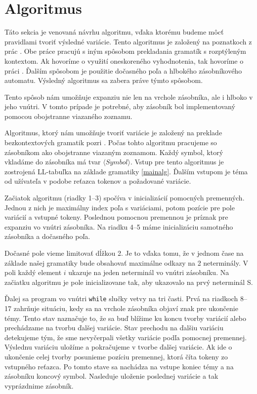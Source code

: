 \section{Algoritmus}
\label{sec:alg}
Táto sekcia je venovaná návrhu algoritmu, vďaka ktorému budeme môcť pravidlami tvoriť výsledné variácie. Tento algoritmus je založený na poznatkoch z prác \cite{tablemusic, FITPUB10498}. Obe práce pracujú s iným spôsobom prekladania gramatík s rozptýleným kontextom. Ak hovoríme o využití oneskoreného vyhodnotenia, tak hovoríme o práci \cite{tablemusic}. Ďalším spôsobom je použitie dočasného poľa a hlbokého zásobníkového automatu. Výsledný algoritmus sa zabera práve týmto spôsobom.

Tento spôsob nám umožňuje expanziu nie len na vrchole zásobníka, ale i hlboko v jeho vnútri. V tomto prípade je potrebné, aby zásobník bol implementovaný pomocou obojstranne viazaného zoznamu.

Algoritmus, ktorý nám umožňuje tvoriť variácie je založený na preklade bezkontextových gramatik pozri \cite{FITPUB10524}. Počas tohto algoritmu pracujeme so zásobníkom ako obojstranne viazaným zoznamom. Každý symbol, ktorý vkladáme do zásobníka má tvar $ \langle Symbol \rangle $. Vstup pre tento algoritmus je zostrojená LL-tabuľka na základe gramatiky \ref{mainalg}. Ďalším vstupom je téma od užívateľa v podobe reťazca tokenov a požadované variácie.

Začiatok algoritmu (riadky 1--3) spočíva v inicializácií pomocných premenných. Jednou z nich je maximálny index poľa s variáciami, potom pozície pre pole variácií a vstupné tokeny. Poslednou pomocnou premennou je príznak pre expanziu vo vnútri zásobníka. Na riadku 4--5 máme inicializáciu samotného zásobníka a dočasného poľa.

Dočasné pole vieme limitovať dĺžkou 2. Je to vďaka tomu, že v jednom čase na základe našej gramatiky bude obsahovať maximálne odkazy na 2 neterminály. V poli každý element $i$ ukazuje na jeden neterminál vo vnútri zásobníku. Na začiatku algoritmu je pole inicializovane tak, aby ukazovalo na prvý neterminál S.

Ďalej sa program vo vnútri \texttt{while} slučky vetvy na tri časti. Prvá na riadkoch 8--17 zahrňuje situáciu, kedy sa na vrchole zásobníka objaví znak pre ukončenie témy. Tento stav naznačuje to, že sa buď blížime ku koncu tvorby variácií alebo prechádzame na tvorbu ďalšej variácie. Stav prechodu na ďalšiu variáciu detekujeme tým, že sme nevyčerpali všetky variácie podľa pomocnej premennej. Výslednu variáciu uložíme a pokračujeme v tvorbe ďalšej variácie. Ak ide o ukončenie celej tvorby posunieme pozíciu premennej, ktorá číta tokeny zo vstupného reťazca. Po tomto stave sa nachádza na vstupe koniec témy a na zásobníku koncový symbol. Nasleduje uloženie poslednej variácie a tak vyprázdnime zásobník.

